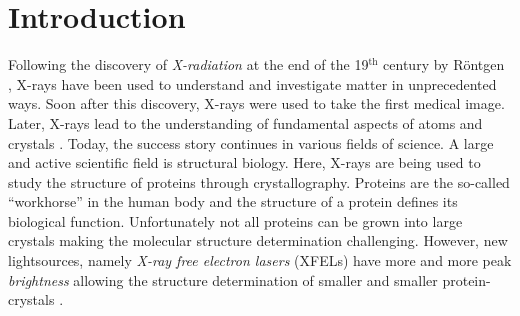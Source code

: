 \chapter{Introduction}
Following the discovery of \textit{X-radiation} at the end of the 19$^{\text{th}}$ century by R\"ontgen \cite{Roentgen-NP}, X-rays have been used to understand and investigate matter in unprecedented ways. Soon after this discovery, X-rays were used to take the first medical image. Later, X-rays lead to the understanding of fundamental aspects of atoms \citep{Siegbahn-NP} and crystals \citep{Laue-NP,Bragg-NP}. Today, the success story continues in various fields of science. A large and active scientific field is structural biology. Here, X-rays are being used to study the structure of proteins through crystallography. Proteins are the so-called ``workhorse'' in the human body and the structure of a protein defines its biological function. Unfortunately not all proteins can be grown into large crystals making the molecular structure determination challenging. However, new lightsources, namely \textit{X-ray free electron lasers} (XFELs) \citep{Ackermann-2007-NPho} have more and more peak \textit{brightness} allowing the structure determination of smaller and smaller protein-crystals \citep{Chapman-2011-Nature}.\\[1\baselineskip]
